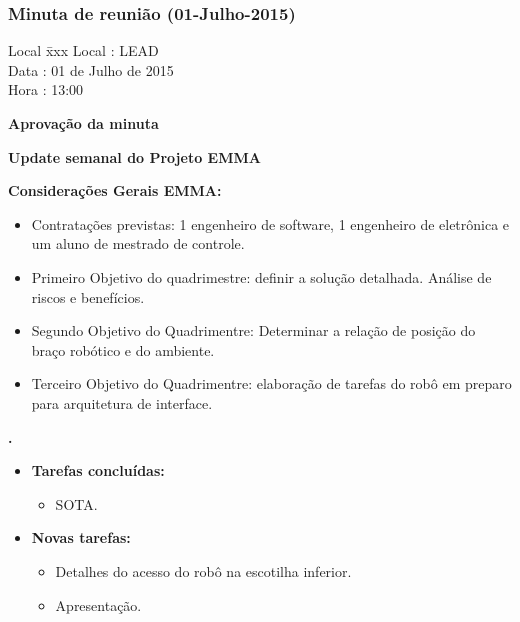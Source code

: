\subsubsection{Minuta de reunião (01-Julho-2015)}

\begin{tabbing}
  Local \= xxx \kill
  Local \> : LEAD \\
  Data  \> : 01 de Julho de 2015 \\
  Hora  \> : 13:00
\end{tabbing}


\textbf{Aprovação da minuta}

\textbf{Update semanal do Projeto EMMA}

\textbf{Considerações Gerais EMMA:}
  \begin{itemize}
    \item Contratações previstas: 1 engenheiro de software, 1 engenheiro de
    eletrônica e um aluno de mestrado de controle.
    \item Primeiro Objetivo do quadrimestre: definir a solução detalhada.
    Análise de riscos e benefícios.
    \item Segundo Objetivo do Quadrimentre: Determinar a relação de posição do
    braço robótico e do ambiente.
    \item Terceiro Objetivo do Quadrimentre: elaboração de tarefas do robô em
    preparo para arquitetura de interface.
  \end{itemize}
  
  
\textbf{\renan.} 
	\begin{itemize}
		\item \textbf{Tarefas concluídas:}
			\begin{itemize}    
				\item SOTA.
			\end{itemize}
		
		\item \textbf{Novas tarefas:}
			\begin{itemize} 
				\item Detalhes do acesso do robô na escotilha inferior.
				\item Apresentação.
			\end{itemize}
	\end{itemize}
		
